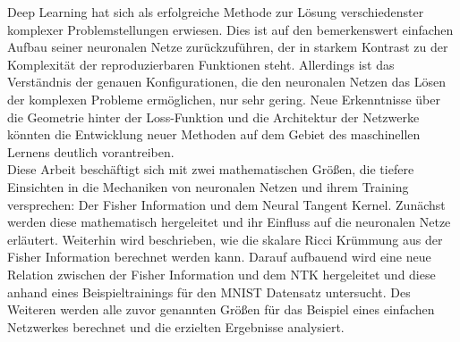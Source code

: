 Deep Learning hat sich als erfolgreiche Methode zur Lösung verschiedenster komplexer Problemstellungen erwiesen. Dies ist auf den bemerkenswert einfachen Aufbau seiner neuronalen Netze zurückzuführen, der in starkem Kontrast zu der Komplexität der reproduzierbaren Funktionen steht. Allerdings ist das Verständnis der genauen Konfigurationen, die den neuronalen Netzen das Lösen der komplexen Probleme ermöglichen, nur sehr gering. Neue Erkenntnisse über die Geometrie hinter der Loss-Funktion und die Architektur der Netzwerke könnten die Entwicklung neuer Methoden auf dem Gebiet des maschinellen Lernens deutlich vorantreiben.\\
Diese Arbeit beschäftigt sich mit zwei mathematischen Grö\ss en, die tiefere Einsichten in die Mechaniken von neuronalen Netzen und ihrem Training versprechen: Der Fisher Information und dem Neural Tangent Kernel. Zunächst werden diese mathematisch hergeleitet und ihr Einfluss auf die neuronalen Netze erläutert. Weiterhin wird beschrieben, wie die skalare Ricci Krümmung aus der Fisher Information berechnet werden kann. Darauf aufbauend wird eine neue Relation zwischen der Fisher Information und dem NTK hergeleitet und diese anhand eines Beispieltrainings für den MNIST Datensatz untersucht. Des Weiteren werden alle zuvor genannten Grö\ss en für das Beispiel eines einfachen Netzwerkes berechnet und die erzielten Ergebnisse analysiert.